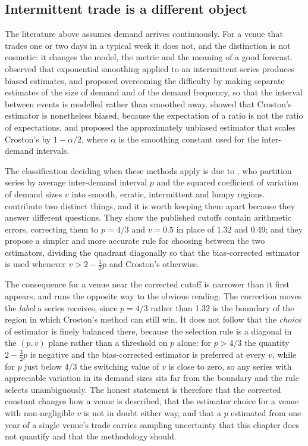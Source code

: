 \subsection*{Intermittent trade is a different object}

The literature above assumes demand arrives continuously. For a venue that
trades one or two days in a typical week it does not, and the distinction is
not cosmetic: it changes the model, the metric and the meaning of a good
forecast. \citet{croston_forecasting_1972} observed that exponential smoothing
applied to an intermittent series produces biased estimates, and proposed
overcoming the difficulty by making separate estimates of the size of demand
and of the demand frequency, so that the interval between events is modelled
rather than smoothed away. \citet{syntetos_accuracy_2005} showed that
Croston's estimator is nonetheless biased, because the expectation of a ratio
is not the ratio of expectations, and proposed the approximately unbiased
estimator that scales Croston's by $1 - \alpha/2$, where $\alpha$ is the
smoothing constant used for the inter-demand intervals.

The classification deciding when these methods apply is due to
\citet{syntetos_categorization_2005}, who partition series by average
inter-demand interval $p$ and the squared coefficient of variation of demand
sizes $v$ into smooth, erratic, intermittent and lumpy regions.
\citet{kostenko_note_2006} contribute two distinct things, and it is worth
keeping them apart because they answer different questions. They show the
published cutoffs contain arithmetic errors, correcting them to $p = 4/3$ and
$v = 0.5$ in place of 1.32 and 0.49; and they propose a simpler and more
accurate rule for choosing between the two estimators, dividing the quadrant
diagonally so that the bias-corrected estimator is used whenever
$v > 2 - \tfrac{3}{2}p$ and Croston's otherwise.

The consequence for a venue near the corrected cutoff is narrower than it first
appears, and runs the opposite way to the obvious reading. The correction moves
the \emph{label} a series receives, since $p = 4/3$ rather than 1.32 is the
boundary of the region in which Croston's method can still win. It does not
follow that the \emph{choice} of estimator is finely balanced there, because
the selection rule is a diagonal in the $(p, v)$ plane rather than a threshold
on $p$ alone: for $p > 4/3$ the quantity $2 - \tfrac{3}{2}p$ is negative and
the bias-corrected estimator is preferred at every $v$, while for $p$ just
below $4/3$ the switching value of $v$ is close to zero, so any series with
appreciable variation in its demand sizes sits far from the boundary and the
rule selects unambiguously. The honest statement is therefore that the
corrected constant changes how a venue is described, that the estimator choice
for a venue with non-negligible $v$ is not in doubt either way, and that a $p$
estimated from one year of a single venue's trade carries sampling uncertainty
that this chapter does not quantify and that the methodology should.

